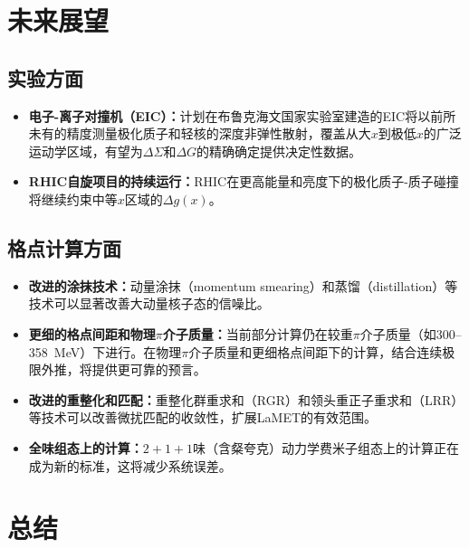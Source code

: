 \documentclass[12pt,a4paper]{ctexart}
\theoremstyle{definition}
\begin{document}
\section{未来展望}

\subsection{实验方面}

\begin{itemize}
    \item \textbf{电子-离子对撞机（EIC）：}计划在布鲁克海文国家实验室建造的EIC将以前所未有的精度测量极化质子和轻核的深度非弹性散射，覆盖从大$x$到极低$x$的广泛运动学区域，有望为$\Delta\Sigma$和$\Delta G$的精确确定提供决定性数据\cite{EIC}。

    \item \textbf{RHIC自旋项目的持续运行：}RHIC在更高能量和亮度下的极化质子-质子碰撞将继续约束中等$x$区域的$\Delta g(x)$\cite{DSSV14}。
\end{itemize}

\subsection{格点计算方面}

\begin{itemize}
    \item \textbf{改进的涂抹技术：}动量涂抹（momentum smearing）和蒸馏（distillation）等技术可以显著改善大动量核子态的信噪比\cite{NoteGluonPDFs,Egerer2021}。

    \item \textbf{更细的格点间距和物理$\pi$介子质量：}当前部分计算仍在较重$\pi$介子质量（如300--358~MeV）下进行。在物理$\pi$介子质量和更细格点间距下的计算，结合连续极限外推，将提供更可靠的预言\cite{Chen2025gluon}。

    \item \textbf{改进的重整化和匹配：}重整化群重求和（RGR）和领头重正子重求和（LRR）等技术可以改善微扰匹配的收敛性，扩展LaMET的有效范围\cite{Zhang2023RGR,Su2023LRR}。

    \item \textbf{全味组态上的计算：}$2+1+1$味（含粲夸克）动力学费米子组态上的计算正在成为新的标准\cite{CLQCD2024,CLQCD2025}，这将减少系统误差。
\end{itemize}

\section{总结}
\end{document}
